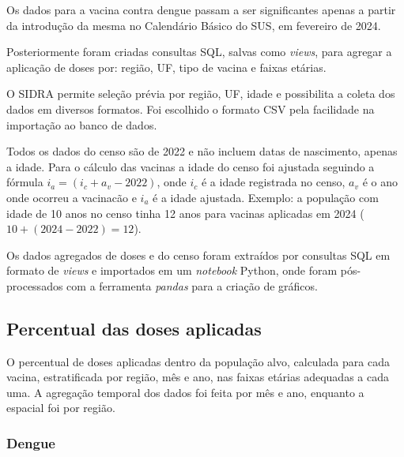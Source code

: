 \documentclass[12pt]{article}
\begin{document}
Os dados para a vacina contra dengue passam a ser significantes apenas a partir da introdução da mesma no Calendário Básico do SUS, em fevereiro de 2024.

Posteriormente foram criadas consultas SQL, salvas como \emph{views}, para agregar a aplicação de doses por: região, UF, tipo de vacina e faixas etárias.

O SIDRA permite seleção prévia por região, UF, idade e possibilita a coleta dos dados em diversos formatos. Foi escolhido o formato CSV pela facilidade na importação ao banco de dados.

Todos os dados do censo são de 2022 e não incluem datas de nascimento, apenas a idade. Para o cálculo das vacinas a idade do censo foi ajustada seguindo a fórmula $i_a = (i_c + a_v - 2022)$, onde $i_c$ é a idade registrada no censo, $a_v$ é o ano onde ocorreu a vacinacão e $i_a$ é a idade ajustada. Exemplo: a população com idade de 10 anos no censo tinha 12 anos para vacinas aplicadas em 2024 ($10 + (2024 - 2022) = 12$).

Os dados agregados de doses e do censo foram extraídos por consultas SQL em formato de \emph{views} e importados em um \emph{notebook} Python, onde foram pós-processados com a ferramenta \emph{pandas} para a criação de gráficos.

\subsection{Percentual das doses aplicadas}
O percentual de doses aplicadas dentro da população alvo, calculada para cada vacina, estratificada por região, mês e ano, nas faixas etárias adequadas a cada uma. A agregação temporal dos dados foi feita por mês e ano, enquanto a espacial foi por região.

\subsubsection{Dengue}
\end{document}
